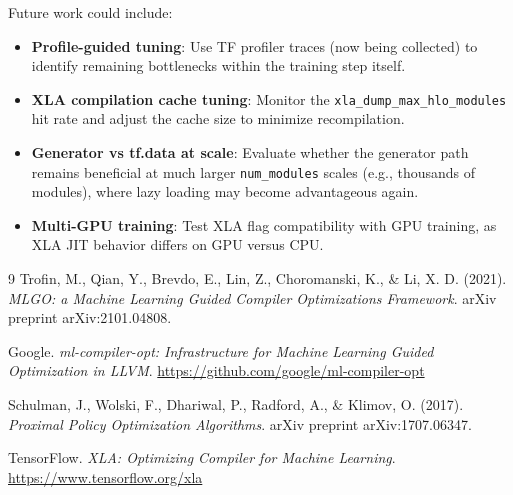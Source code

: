 \documentclass[10pt]{article}
\begin{document}
Future work could include:

\begin{itemize}
    \item \textbf{Profile-guided tuning}: Use TF profiler traces (now being collected) to identify remaining bottlenecks within the training step itself.
    \item \textbf{XLA compilation cache tuning}: Monitor the \texttt{xla\_dump\_max\_hlo\_modules} hit rate and adjust the cache size to minimize recompilation.
    \item \textbf{Generator vs tf.data at scale}: Evaluate whether the generator path remains beneficial at much larger \texttt{num\_modules} scales (e.g., thousands of modules), where lazy loading may become advantageous again.
    \item \textbf{Multi-GPU training}: Test XLA flag compatibility with GPU training, as XLA JIT behavior differs on GPU versus CPU.
\end{itemize}

\begin{thebibliography}{9}
Trofin, M., Qian, Y., Brevdo, E., Lin, Z., Choromanski, K., \& Li, X. D. (2021).
\emph{MLGO: a Machine Learning Guided Compiler Optimizations Framework}.
arXiv preprint arXiv:2101.04808.

Google. \emph{ml-compiler-opt: Infrastructure for Machine Learning Guided Optimization in LLVM}.
\url{https://github.com/google/ml-compiler-opt}

Schulman, J., Wolski, F., Dhariwal, P., Radford, A., \& Klimov, O. (2017).
\emph{Proximal Policy Optimization Algorithms}. arXiv preprint arXiv:1707.06347.

TensorFlow. \emph{XLA: Optimizing Compiler for Machine Learning}.
\url{https://www.tensorflow.org/xla}
\end{thebibliography}
\end{document}

